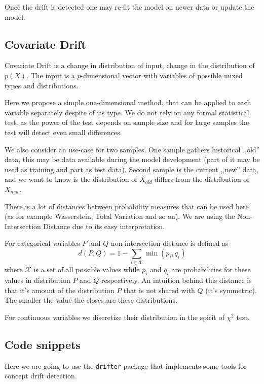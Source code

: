 \documentclass[12pt,]{krantz}
\begin{document}
Once the drift is detected one may re-fit the model on newer data or update the model.

\hypertarget{covariate-drift}{%
\subsection{Covariate Drift}\label{covariate-drift}}

Covariate Drift is a change in distribution of input, change in the distribution of \(p(X)\). The input is a \(p\)-dimensional vector with variables of possible mixed types and distributions.

Here we propose a simple one-dimensional method, that can be applied to each variable separately despite of its type. We do not rely on any formal statistical test, as the power of the test depends on sample size and for large samples the test will detect even small differences.

We also consider an use-case for two samples. One sample gathers historical ,,old'' data, this may be data available during the model development (part of it may be used as training and part as test data). Second sample is the current ,,new'' data, and we want to know is the distribution of \(X_{old}\) differs from the distribution of \(X_{new}\).

There is a lot of distances between probability measures that can be used here (as for example Wasserstein, Total Variation and so on). We are using the Non-Intersection Distance due to its easy interpretation.

For categorical variables \(P\) and \(Q\) non-intersection distance is defined as
\[
d(P,Q) = 1 - \sum_{i\in \mathcal X} \min(p_i, q_i)
\]
where \(\mathcal X\) is a set of all possible values while \(p_i\) and \(q_i\) are probabilities for these values in distribution \(P\) and \(Q\) respectively. An intuition behind this distance is that it's amount of the distribution \(P\) that is not shared with \(Q\) (it's symmetric). The smaller the value the closes are these distributions.

For continuous variables we discretize their distribution in the spirit of \(\chi^2\) test.

\hypertarget{code-snippets}{%
\subsection{Code snippets}\label{code-snippets}}

Here we are going to use the \texttt{drifter} package that implements some tools for concept drift detection.
\end{document}
